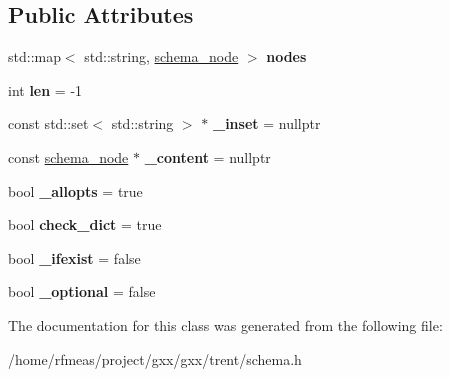 \subsection*{Public Attributes}
\begin{DoxyCompactItemize}
\item 
std\+::map$<$ std\+::string, \hyperlink{classgxx_1_1schema_1_1schema__node}{schema\+\_\+node} $>$ {\bfseries nodes}\hypertarget{classgxx_1_1schema_1_1schema__node_aca34f5895a00a00319ee58f9fb3a40e9}{}\label{classgxx_1_1schema_1_1schema__node_aca34f5895a00a00319ee58f9fb3a40e9}

\item 
int {\bfseries len} = -\/1\hypertarget{classgxx_1_1schema_1_1schema__node_a2228ae13084733e4db1d90fc09dc4b5c}{}\label{classgxx_1_1schema_1_1schema__node_a2228ae13084733e4db1d90fc09dc4b5c}

\item 
const std\+::set$<$ std\+::string $>$ $\ast$ {\bfseries \+\_\+inset} = nullptr\hypertarget{classgxx_1_1schema_1_1schema__node_ae68fe62ecc04aa1dbee1a8540637b1c4}{}\label{classgxx_1_1schema_1_1schema__node_ae68fe62ecc04aa1dbee1a8540637b1c4}

\item 
const \hyperlink{classgxx_1_1schema_1_1schema__node}{schema\+\_\+node} $\ast$ {\bfseries \+\_\+content} = nullptr\hypertarget{classgxx_1_1schema_1_1schema__node_ad48ebf5793278c2baef6896083f0b4af}{}\label{classgxx_1_1schema_1_1schema__node_ad48ebf5793278c2baef6896083f0b4af}

\item 
bool {\bfseries \+\_\+allopts} = true\hypertarget{classgxx_1_1schema_1_1schema__node_a40eb37a5b1addccd1cfcaf4128f3a976}{}\label{classgxx_1_1schema_1_1schema__node_a40eb37a5b1addccd1cfcaf4128f3a976}

\item 
bool {\bfseries check\+\_\+dict} = true\hypertarget{classgxx_1_1schema_1_1schema__node_a86f481d850923a215c2a486ff4f0e49f}{}\label{classgxx_1_1schema_1_1schema__node_a86f481d850923a215c2a486ff4f0e49f}

\item 
bool {\bfseries \+\_\+ifexist} = false\hypertarget{classgxx_1_1schema_1_1schema__node_aa82855bd2a7f48ad0544dfc4532d5469}{}\label{classgxx_1_1schema_1_1schema__node_aa82855bd2a7f48ad0544dfc4532d5469}

\item 
bool {\bfseries \+\_\+optional} = false\hypertarget{classgxx_1_1schema_1_1schema__node_a316159f16a5bb9e0de7352fe5f193db1}{}\label{classgxx_1_1schema_1_1schema__node_a316159f16a5bb9e0de7352fe5f193db1}

\end{DoxyCompactItemize}


The documentation for this class was generated from the following file\+:\begin{DoxyCompactItemize}
\item 
/home/rfmeas/project/gxx/gxx/trent/schema.\+h\end{DoxyCompactItemize}
